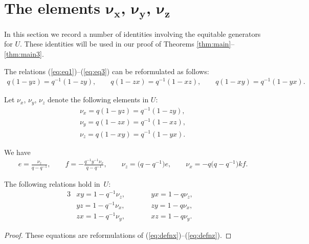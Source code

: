 \section[The elements $\nu_x$, $\nu_y$, $\nu_z$]{The elements $\boldsymbol{\nu_x}$, $\boldsymbol{\nu_y}$, $\boldsymbol{\nu_z}$}\label{section3}

In this section we record a number of
identities involving
the equitable generators for
$U$.
These identities will be used in our
proof of Theorems
\ref{thm:main}--\ref{thm:main3}.


The relations
(\ref{eq:eq1})--(\ref{eq:eq3})
can be reformulated as follows:
\begin{gather*}
q(1-yz) = q^{-1}(1-zy),
\qquad
q(1-zx) = q^{-1}(1-xz),
\qquad
q(1-xy) = q^{-1}(1-yx).
\end{gather*}

\begin{Definition}
\label{def:nx}
Let $\nu_x$, $\nu_y$, $\nu_z$ denote the following elements
in
$U$:
\begin{gather}
 \nu_x = q(1-yz)=q^{-1}(1-zy),
\label{eq:defnx}
\\
 \nu_y = q(1-zx)=q^{-1}(1-xz),
\label{eq:defny}
\\
 \nu_z = q(1-xy)=q^{-1}(1-yx).
\label{eq:defnz}
\end{gather}
\end{Definition}

\begin{Note}
\label{note:efview}
We have
\begin{gather*}
 e =\frac{\nu_z}{q-q^{-1}},
\qquad
f =-\frac{q^{-1} y^{-1}\nu_x}{q-q^{-1}},
\qquad
 \nu_z = \big(q-q^{-1}\big)e, \qquad
\nu_x = -q\big(q-q^{-1}\big)kf.
\end{gather*}
\end{Note}




\begin{Lemma}
\label{lem:prod}
The following relations hold in~$U$:
\begin{alignat}{3}
& xy =1-q^{-1}\nu_z, \qquad && yx = 1-q\nu_z,&
\label{eq:xyx}
\\
& yz =1-q^{-1}\nu_x, \qquad &&  zy = 1-q\nu_x,&
\label{eq:yzy}
\\
& zx =1-q^{-1}\nu_y, \qquad && xz = 1-q\nu_y.&
\label{eq:zxz}
\end{alignat}
\end{Lemma}

\begin{proof}
These equations are
reformulations of
(\ref{eq:defnx})--(\ref{eq:defnz}).
\end{proof}


